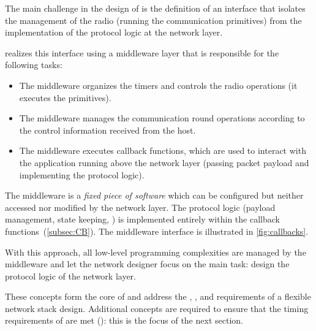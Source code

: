 The main challenge in the design of \baloo is the definition of an interface that isolates the management of the radio (\ie running the \ST communication primitives) from the implementation of the protocol logic at the network layer.
%
{\setlength{\parskip}{0pt}%
\baloo realizes this interface using a middleware layer that is responsible for the following tasks:
\begin{itemize}[nosep]

	\item The middleware organizes the timers and controls the radio operations (\ie it executes the \ST primitives).

	\item The middleware manages the communication round operations according to the control information received from the host.

	\item The middleware executes callback functions, which are used to interact with the application running above the network layer (\ie passing packet payload and implementing the protocol logic).

\end{itemize}
The middleware is a \textsl{fixed piece of software} which can be configured but neither accessed nor modified by the network layer.
The protocol logic (payload management, state keeping, \etc) is implemented entirely within the callback functions~(\cref{subsec:CB}).%
The middleware interface is illustrated in \cref{fig:callbacks}.%
}

With this approach, all low-level programming complexities are managed by the middleware and let the network designer focus on the main task: design the protocol logic of the network layer.

These concepts form the core of \baloo and address the , ,  and  requirements of a flexible network stack design.
Additional concepts are required to ensure that the timing requirements of \ST are met (): this is the focus of the next section.
